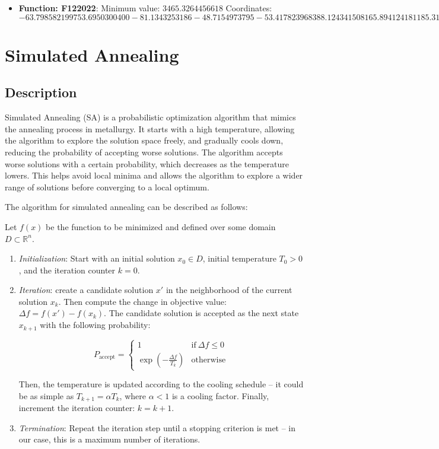 \documentclass{article}
\begin{document}
\begin{itemize}
  \item \textbf{Function: F122022}:
    Minimum value: $3465.3264456618$
    Coordinates: $$-63.7985821997  53.6950300400  -81.1343253186
    -48.7154973795  -53.4178239683  88.1243415081  65.8941241811
    85.3185102737  57.6308477191  25.8517981743  -97.7756178377
    24.0702691153  84.4245995734  48.2687274029  29.7864160386
    -38.6240455568  98.7671174170  83.0775235924  86.1377494180  76.2793216154 \allowbreak
    $$

\end{itemize}

\section{Simulated Annealing}

\subsection{Description}

Simulated Annealing (SA) is a probabilistic optimization algorithm
that mimics the annealing process in metallurgy. It starts with a
high temperature, allowing the algorithm to explore the solution space
freely, and gradually cools down, reducing the probability of accepting
worse solutions. The algorithm accepts worse solutions with a certain
probability, which decreases as the temperature lowers. This helps
avoid local minima and allows the algorithm to explore a wider range of
solutions before converging to a local optimum.

The algorithm for simulated annealing can be described as follows:

Let $f(x)$ be the function to be minimized and defined over some domain
$D \subset \mathbb{R}^n$.

\begin{enumerate}
  \item \textit{Initialization}: Start with an initial solution $x_0
    \in D$, initial temperature $T_0 > 0$, and the iteration counter $k = 0$.
  \item \textit{Iteration}: create a candidate solution $x'$ in the
    neighborhood of the current solution $x_k$. Then compute the
    change in objective value: $\Delta f = f(x') - f(x_k)$. The
    candidate solution is accepted as the next state $x_{k+1}$ with
    the following probability:

    $$ P_{\text{accept}} =
    \begin{cases} 1 & \text{if} \ \Delta f\leq 0\\ \exp\left(
      -\frac{\Delta f}{T_{k}}\right) & \text{otherwise}
    \end{cases} $$

    Then, the temperature is updated according to the cooling
    schedule -- it could be as simple as $T_{k+1} = \alpha T_k$,
    where $\alpha < 1$ is a cooling factor. Finally, increment the
    iteration counter: $k = k + 1$.
  \item \textit{Termination}: Repeat the iteration step until a
    stopping criterion is met -- in our case, this is a maximum
    number of iterations.
\end{enumerate}
\end{document}
